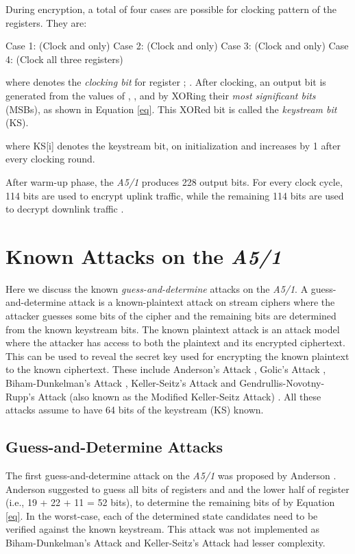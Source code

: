 \documentclass{llncs}
\begin{document}
During encryption, a total of four cases are possible for clocking pattern of the registers. They are:
\begin{center}
Case 1:  (Clock  and  only)
\newline Case 2:  (Clock  and  only)
\newline Case 3:  (Clock  and  only)
\newline Case 4:  (Clock  all three registers)
\newline
\end{center}
where  denotes the \emph{clocking bit} for register ; .
\newline\newline
After clocking, an output bit is generated from the values of , , and  by XORing their \emph{most significant bits} (MSBs), as shown in Equation \ref{eq}. This XORed bit is called the \emph {keystream bit} (KS).

where KS[i] denotes the  keystream bit,  on initialization and increases by 1 after every clocking round.


After warm-up phase, the \emph{A5/1} produces 228 output bits. For every clock cycle, 114 bits are used to encrypt uplink traffic, while the remaining 114 bits are used to decrypt downlink traffic \cite{[Gend]}.

\section{Known Attacks on the \emph{A5/1}}
Here we discuss the known \emph{guess-and-determine} attacks on the \emph{A5/1}. A guess-and-determine attack \cite{[Men]} is a known-plaintext attack on stream ciphers where the attacker guesses some bits of the cipher and the remaining bits are determined from the known keystream bits. The known plaintext attack is an attack model where the attacker has access to both the plaintext and its encrypted ciphertext. This can be used to reveal the secret key used for encrypting the known plaintext to the known ciphertext. These include Anderson's Attack \cite{[And]}, Golic's Attack \cite{[Golic]}, Biham-Dunkelman's Attack \cite{[BD]}, Keller-Seitz's Attack \cite{[KS01]} and Gendrullis-Novotny-Rupp's Attack (also known as the Modified Keller-Seitz Attack) \cite{[Rupp]}. All these attacks assume to have 64 bits of the keystream (KS) known.

\subsection{Guess-and-Determine Attacks}
The first guess-and-determine attack on the \emph{A5/1} was proposed by Anderson \cite{[And]}. Anderson suggested to guess all bits of registers  and  and the lower half of register  (i.e., 19 + 22 + 11 = 52 bits), to determine the remaining bits of  by Equation \ref {eq}. In the worst-case, each of the  determined state candidates need to be verified against the known keystream. This attack was not implemented as Biham-Dunkelman's Attack and Keller-Seitz's Attack had lesser complexity.
\end{document}
